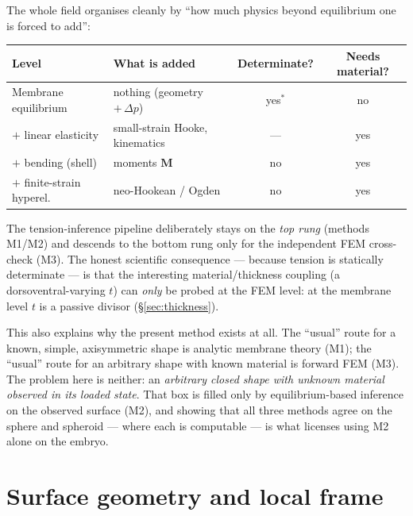 \documentclass[11pt]{article}
\begin{document}
The whole field organises cleanly by ``how much physics beyond equilibrium one
is forced to add'':

\begin{center}
\begin{tabular}{llcc}
\toprule
\textbf{Level} & \textbf{What is added} & \textbf{Determinate?} & \textbf{Needs material?} \\
\midrule
Membrane equilibrium       & nothing (geometry $+\,\Delta p$)        & yes$^\ast$ & no \\
$+$ linear elasticity      & small-strain Hooke, kinematics          & ---        & yes \\
$+$ bending (shell)        & moments $\mathbf M$                     & no         & yes \\
$+$ finite-strain hyperel. & neo-Hookean / Ogden                     & no         & yes \\
\bottomrule
\end{tabular}
\end{center}

\medskip
The tension-inference pipeline deliberately stays on the \emph{top rung} (methods
M1/M2) and descends to the bottom rung only for the independent FEM cross-check
(M3).  The honest scientific consequence — because tension is statically
determinate — is that the interesting material/thickness coupling (a
dorsoventral-varying $t$) can \emph{only} be probed at the FEM level: at the
membrane level $t$ is a passive divisor (\S\ref{sec:thickness}).

This also explains why the present method exists at all.  The ``usual'' route for
a known, simple, axisymmetric shape is analytic membrane theory (M1); the
``usual'' route for an arbitrary shape with known material is forward FEM (M3).
The problem here is neither: an \emph{arbitrary closed shape with unknown material
observed in its loaded state}.  That box is filled only by equilibrium-based
inference on the observed surface (M2), and showing that all three methods agree
on the sphere and spheroid — where each is computable — is what licenses using
M2 alone on the embryo.

\section{Surface geometry and local frame}
\label{sec:geometry}
\end{document}
